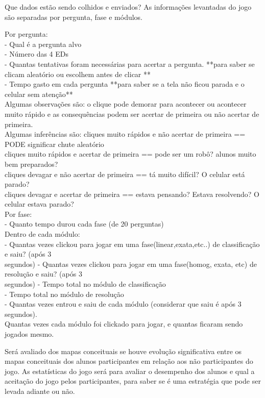 Que dados estão sendo colhidos e enviados? As informações levantadas do jogo são separadas por pergunta, fase e módulos.

Por pergunta:\\
	- Qual é a pergunta alvo\\
	- Número das 4 EDs\\
	- Quantas tentativas foram necessárias para acertar a pergunta. **para saber se clicam aleatório ou escolhem antes de clicar **\\
	- Tempo gasto em cada pergunta  **para saber se a tela não ficou parada e o celular sem atenção**\\

	Algumas observações são: o clique pode demorar para acontecer ou acontecer muito rápido e as consequências podem ser acertar de primeira ou não acertar de primeira.\\
	Algumas inferências são: 
	cliques muito rápidos e não acertar de primeira == PODE significar chute aleatório\\
	cliques muito rápidos e acertar de primeira == pode ser um robô? alunos muito bem preparados?\\
	cliques devagar e não acertar de primeira == tá muito difícil? O celular está parado? \\
	cliques devagar e acertar de primeira == estava pensando? Estava resolvendo? O celular estava parado?\\

Por fase:\\
	- Quanto tempo durou cada fase (de 20 perguntas)\\

Dentro de cada módulo:\\
	- Quantas vezes clickou para jogar em uma fase(linear,exata,etc..) de classificação e saiu? (após 3 \\segundos)
	- Quantas vezes clickou para jogar em uma fase(homog, exata, etc) de resolução e saiu? (após 3 \\segundos)
	- Tempo total no módulo de classificação\\
	- Tempo total no módulo de resolução\\
	- Quantas vezes entrou e saiu de cada módulo (considerar que saiu é após 3 segundos).\\


Quantas vezes cada módulo foi clickado para jogar, e quantas ficaram sendo jogados mesmo.

Será avaliado dos mapas conceituais se houve evolução significativa entre os mapas conceituais dos alunos participantes em relação aos não participantes do jogo.
As estatísticas do jogo será para avaliar o desempenho dos alunos e qual a aceitação do jogo pelos participantes, para saber se é uma estratégia que pode ser levada adiante ou não.
